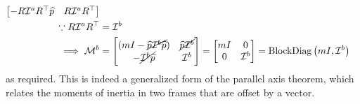 \begin{align*}
\begin{bmatrix}
        - R\mathcal{I}^{a} R^{\top}\widehat{p}                   & R\mathcal{I}^{a} R^{\top}
    \end{bmatrix}
    \\
    \because
    R\mathcal{I}^{a} R^{\top}
     & =
    \mathcal{I}^{b}
    \\
    \implies
    \mathcal{M}^{b}
     & =
    \begin{bmatrix}
        (mI - \cancel{\widehat{p} \mathcal{I}^{b} \widehat{p}}) & \cancel{\widehat{p} \mathcal{I}^{b}} \\
        - \cancel{\mathcal{I}^{b} \widehat{p}}                  & \mathcal{I}^{b}
    \end{bmatrix}
    =
    \begin{bmatrix}
        mI & 0               \\
        0  & \mathcal{I}^{b}
    \end{bmatrix}
    =
    \operatorname{BlockDiag}\left(m I, \mathcal{I}^{b}\right)
\end{align*}
as required.
This is indeed a generalized form of the parallel axis theorem, which relates the moments of inertia in two frames that are offset by a vector.
